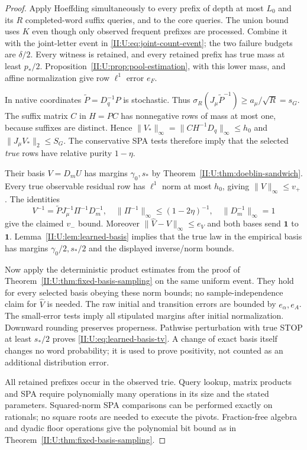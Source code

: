 \begin{proof}
Apply Hoeffding simultaneously to every prefix of depth at most
$L_0$ and its $R$ completed-word suffix queries, and to the core
queries. The union bound uses $K$ even though only observed frequent
prefixes are processed. Combine it with the joint-letter event in
\eqref{II:U:eq:joint-count-event}; the two failure budgets are $\delta/2$.
Every witness is retained, and every retained prefix has true mass
at least $p_*/2$. Proposition~\ref{II:U:prop:pool-estimation}, with this
lower mass, and affine normalization give row $\ell^1$ error $e_F$.

In native coordinates $\widetilde P=D_q^{-1}P$ is stochastic.
Thus $\sigma_R(J_\mu\widetilde P^{-1})\ge a_\mu/\sqrt R=s_G$.
The suffix matrix $C$ in $H=PC$ has nonnegative rows of mass at most
one, because suffixes are distinct. Hence
$\|V_*\|_\infty=\|CH^{-1}D_q\|_\infty\le h_0$ and
$\|J_\mu V_*\|_2\le S_G$.
The conservative SPA tests therefore imply that the selected
\emph{true} rows have relative purity $1-\eta$.

Their basis $V=D_mU$ has margins $\gamma_0,s_*$ by
Theorem~\ref{II:U:thm:doeblin-sandwich}. Every true observable residual
row has $\ell^1$ norm at most $h_0$, giving $\|V\|_\infty\le v_+$.
The identities
\[
 V^{-1}=\widetilde P J_\mu^{-1}\Pi^{-1}D_m^{-1},\quad
 \|\Pi^{-1}\|_\infty\le(1-2\eta)^{-1},\quad
 \|D_m^{-1}\|_\infty=1
\]
give the claimed $v_-$ bound. Moreover
$\|\widehat V-V\|_\infty\le e_V$ and both bases send
$\mathbf1$ to $\mathbf1$. Lemma~\ref{II:U:lem:learned-basis} implies
that the true law in the empirical basis has margins
$\gamma_0/2,s_*/2$ and the displayed inverse/norm bounds.

Now apply the deterministic product estimates from the proof of
Theorem~\ref{II:U:thm:fixed-basis-sampling} on the same uniform event.
They hold for every selected basis obeying these norm bounds; no
sample-independence claim for $\widehat V$ is needed. The raw initial
and transition errors are bounded by $e_\alpha,e_A$. The small-error
tests imply all stipulated margins after initial normalization.
Downward rounding preserves properness. Pathwise perturbation with
true STOP at least $s_*/2$ proves \eqref{II:U:eq:learned-basis-tv}.
A change of exact basis itself changes no word probability; it is
used to prove positivity, not counted as an additional distribution error.

All retained prefixes occur in the observed trie. Query lookup,
matrix products and SPA require polynomially many operations in its
size and the stated parameters. Squared-norm SPA comparisons can be
performed exactly on rationals; no square roots are needed to execute
the pivots. Fraction-free algebra and dyadic floor operations give
the polynomial bit bound as in Theorem~\ref{II:U:thm:fixed-basis-sampling}.
\end{proof}
